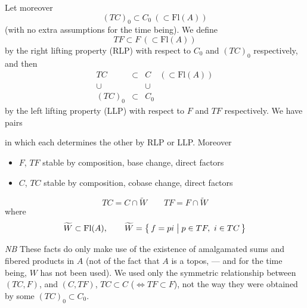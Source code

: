 \documentclass[11pt,a4paper]{article}
\begin{document}
\struck{\ill{}} Let moreover 
\[
  (TC)_0 \subset C_0 \ (\subset \mathrm{Fl}(A))
\]
(with no extra assumptions for the time being). We define 
\[
  TF \subset F \ (\subset \mathrm{Fl}(A))
\]
by the right lifting property (RLP) with respect to 
$C_0$ and $(TC)_0$ respectively, and then
\[
  \begin{array}{ccc}
    TC & \subset & C \quad (\subset \mathrm{Fl}(A)) \\
    \cup & & \cup \\
    (TC)_0 & \subset & C_0
  \end{array}
\]
by the  left lifting property (LLP) with respect to $F$ and
$TF$ respectively. We have pairs



in which each  determines the other by RLP or LLP.
 Moreover
\begin{itemize}
  \item[a)] $F$, $TF$ stable by composition, base change, direct factors
  \item[b)] $C$, $TC$ stable by composition, cobase change, direct factors
\end{itemize}


\[
  TC = C \cap \widetilde{W} \qquad TF = F \cap \widetilde{W}
\]
where
\[
  \widetilde{W} \subset \mathrm{Fl}(A), \qquad
  \widetilde{W} = \bigl\{\, f = pi \bigm| p \in TF,\ i \in TC \,\bigr\}
\]

\emph{NB} These facts do only make use of the existence of 
amalgamated sums and fibered products in $A$ (not of the fact that $A$ is
a topos, — and for the time being, $W$ has not been used). We used only the
symmetric relationship between \struck{\ill{}} $(TC, F)$, and $(C, TF)$,
 $TC \subset C$ ($\Leftrightarrow TF \subset F$), not the
way they were obtained by some  $(TC)_0 \subset C_0$.
\end{document}
